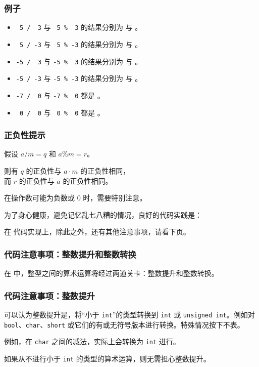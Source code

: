 \begin{frame}
  \frametitle{例子}
  \begin{itemize}
    \item \texttt{ 5 / \ 3} 与 \texttt{ 5 \% \ 3} 的结果分别为  与 。
    \pause
    \pause
    \item \texttt{ 5 / -3} 与 \texttt{ 5 \% -3} 的结果分别为  与 。
    \pause
    \item \texttt{-5 / \ 3} 与 \texttt{-5 \% \ 3} 的结果分别为  与 。
    \pause
    \item \texttt{-5 / -3} 与 \texttt{-5 \% -3} 的结果分别为  与 。
    \pause
    \pause
    \item \texttt{-7 / \ 0} 与 \texttt{-7 \% \ 0} 都是 。
    \pause
    \item \texttt{ 0 / \ 0} 与 \texttt{ 0 \% \ 0} 都是 。
  \end{itemize}
\end{frame}
\begin{frame}
  \frametitle{正负性提示}
  假设 $a \mathbin{\texttt{/}} m = q$ 和 $a \mathbin{\texttt{\%}} m = r$。
  
  则有 $q$ 的正负性与 $a \cdot m$ 的正负性相同，\\
  \-\hspace{1em}而 $r$ 的正负性与 $a$ 的正负性相同。
  
  \emptyline
  在操作数可能为负数或 $0$ 时，需要特别注意。
  \pause
  
  \emptyline
  为了身心健康，避免记忆乱七八糟的情况，良好的代码实践是：
  \begin{center}
  \end{center}
  \pause
  
  在 \Cpp{} 代码实现上，除此之外，还有其他注意事项，请看下页。
\end{frame}
\begin{frame}
  \frametitle{\textbf{代码注意事项}：整数提升和整数转换}
  在 \Cpp{} 中，整型之间的算术运算将经过两道关卡：\alert{整数提升}和\alert{整数转换}。
\end{frame}
\begin{frame}
  \frametitle{\textbf{代码注意事项}：整数提升}
  可以认为\alert{整数提升}是，将“小于 \texttt{int}”的类型转换到 \texttt{int} 或 \texttt{unsigned int}。例如对 \texttt{bool}、\texttt{char}、\texttt{short} 或它们的有或无符号版本进行转换。特殊情况按下不表。
  
  \emptyline
  例如，在 \texttt{char} 之间的减法，实际上会转换为 \texttt{int} 进行。
  
  \emptyline
  如果从不进行小于 \texttt{int} 的类型的算术运算，则无需担心整数提升。
\end{frame}

